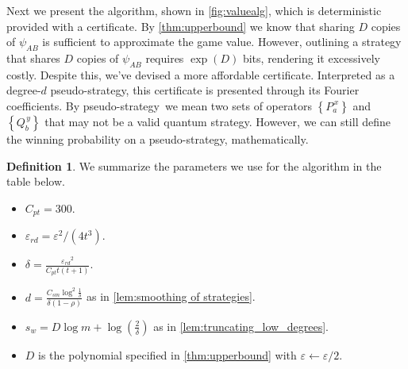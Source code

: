 \documentclass[11pt]{article}
\theoremstyle{plain}
\theoremstyle{definition}
\newtheorem{definition}[theorem]{Definition}
\newcommand {\set} [1] {\ensuremath{ \left\lbrace #1 \right\rbrace }}
\newcommand {\br} [1] {\ensuremath{ \left( #1 \right) }}
\newcommand{\ep} {\ensuremath{\varepsilon}}
\newcommand{\ccsm} {\ensuremath{C_{sm}}}
\newcommand{\dmcc} {\ensuremath{C_{pt}}}
\newcommand{\dlbo} {\ensuremath{{D}}}
\newcommand{\dldd} {\ensuremath{{d}}}
\newcommand{\wireal} {\ensuremath{{s_{w}}}}
\newcommand{\eprd} {\ensuremath{\ep_{rd}}}
\newcommand{\pseudostrategy} {pseudo-strategy}
\newcommand{\Pss} {\ensuremath{P^{\,x}_a}}
\newcommand{\Qss} {\ensuremath{Q^{\,y}_b}}
\newcommand{\1}{\mathbb{1}} %
\begin{document}
Next we present the algorithm, shown in \cref{fig:valuealg}, which is deterministic provided with a certificate. 
By \cref{thm:upperbound} we know that sharing $\dlbo$ copies of $\psi_{AB}$ is sufficient to approximate the game value. However, outlining a strategy that shares $\dlbo$ copies of $\psi_{AB}$ requires $\exp\br{\dlbo}$ bits, rendering it excessively costly. Despite this, we've devised a more affordable certificate. Interpreted as a degree-$\dldd$ \pseudostrategy, this certificate is presented through its Fourier coefficients. By \pseudostrategy\ we mean two sets of operators $\set{\Pss}$ and $\set{\Qss}$ that may not be a valid quantum strategy. However, we can still define the winning probability on a 
\pseudostrategy, mathematically.

\begin{definition}\label{def:params-np}
We summarize the parameters we use for the algorithm in the table below.
\begin{itemize}
  \item $\dmcc=300$.
  \item $\eprd=\ep^2/(4t^3)$.
  \item $\delta = \frac{\eprd^2}{\dmcc t(t+1)}$.
  \item $\dldd=\frac{\ccsm\log^2\frac{1}{\delta}}{\delta(1-\rho)}$ as in \cref{lem:smoothing of strategies}.
  \item $\wireal = D\log m + \log\br{\frac{2}{\delta}}$ as in \cref{lem:truncating_low_degrees}.
  \item $\dlbo$ is the polynomial specified in \cref{thm:upperbound} with $\ep\gets\ep/2$.
\end{itemize}
\end{definition}
\end{document}
